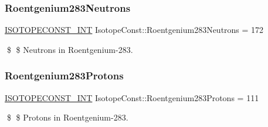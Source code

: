 \subsubsection{\texorpdfstring{Roentgenium283\+Neutrons}{Roentgenium283Neutrons}}
{\footnotesize\ttfamily \mbox{\hyperlink{group___isotope_const-_macros_ga5f18360b3e99483a35c32d789e62621c}{I\+S\+O\+T\+O\+P\+E\+C\+O\+N\+S\+T\+\_\+\+I\+NT}} Isotope\+Const\+::\+Roentgenium283\+Neutrons = 172}

\$ \$ Neutrons in Roentgenium-\/283. \mbox{\label{group___isotope_const-_roentgenium-_rg283_ga1c09b233d9cfe1cfa64e903b64a94a31}} 
\subsubsection{\texorpdfstring{Roentgenium283\+Protons}{Roentgenium283Protons}}
{\footnotesize\ttfamily \mbox{\hyperlink{group___isotope_const-_macros_ga5f18360b3e99483a35c32d789e62621c}{I\+S\+O\+T\+O\+P\+E\+C\+O\+N\+S\+T\+\_\+\+I\+NT}} Isotope\+Const\+::\+Roentgenium283\+Protons = 111}

\$ \$ Protons in Roentgenium-\/283. 